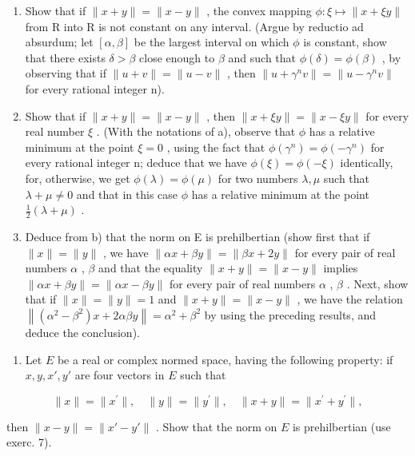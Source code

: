 \begin{enumerate}
\def\labelenumi{\alph{enumi})}
\item
  Show that if \(\|x+y\|=\|x-y\|\) , the convex mapping \(\phi:\xi\mapsto\|x+\xi y\|\) from R into R is not constant on any interval. (Argue by reductio ad absurdum; let \([\alpha,\beta]\) be the largest interval on which \(\phi\) is constant, show that there exists \(\delta>\beta\) close enough to \(\beta\) and such that \(\phi(\delta)=\phi(\beta)\) , by observing that if \(\|u+v\|=\|u-v\|\) , then \(\|u+\gamma^{n}v\|=\|u-\gamma^{n}v\|\) for every rational integer n).
\item
  Show that if \(\|x + y\| = \|x - y\|\) , then \(\|x + \xi y\| = \|x - \xi y\|\) for every real number \(\xi\) . (With the notations of a), observe that \(\phi\) has a relative minimum at the point \(\xi = 0\) , using the fact that \(\phi(\gamma^{n}) = \phi(-\gamma^{n})\) for every rational integer n; deduce that we have \(\phi(\xi) = \phi(-\xi)\) identically, for, otherwise, we get \(\phi(\lambda) = \phi(\mu)\) for two numbers \(\lambda, \mu\) such that \(\lambda + \mu \neq 0\) and that in this case \(\phi\) has a relative minimum at the point \(\frac{1}{2}(\lambda + \mu)\) .
\item
  Deduce from b) that the norm on E is prehilbertian (show first that if \(\|x\| = \|y\|\) , we have \(\|\alpha x + \beta y\| = \|\beta x + 2y\|\) for every pair of real numbers \(\alpha\) , \(\beta\) and that the equality \(\|x + y\| = \|x - y\|\) implies \(\|\alpha x + \beta y\| = \|\alpha x - \beta y\|\) for every pair of real numbers \(\alpha\) , \(\beta\) . Next, show that if \(\|x\| = \|y\| = 1\) and \(\|x + y\| = \|x - y\|\) , we have the relation \(\left\|\left(\alpha^{2} - \beta^{2}\right)x + 2\alpha\beta y\right\| = \alpha^{2} + \beta^{2}\) by using the preceding results, and deduce the conclusion).
\end{enumerate}

\begin{enumerate}
\def\labelenumi{\arabic{enumi})}
\setcounter{enumi}{7}
\tightlist
\item
  Let \(E\) be a real or complex normed space, having the following property: if \(x, y, x', y'\) are four vectors in \(E\) such that
\end{enumerate}

\[
\| x \| = \| x ^ {\prime} \|, \quad \| y \| = \| y ^ {\prime} \|, \quad \| x + y \| = \| x ^ {\prime} + y ^ {\prime} \|,
\]

then \(\| x - y \| = \| x' - y' \|\) . Show that the norm on \(E\) is prehilbertian (use exerc. 7).

